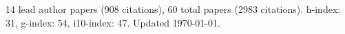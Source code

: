 14 lead author papers (908 citations),
60 total papers (2983 citations).\newline
h-index: 31, g-index: 54, i10-index: 47. Updated \today.